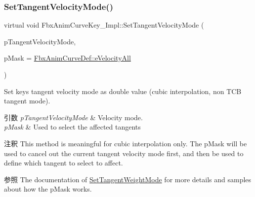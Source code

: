 \subsubsection{\texorpdfstring{Set\+Tangent\+Velocity\+Mode()}{SetTangentVelocityMode()}}
{\footnotesize\ttfamily virtual void Fbx\+Anim\+Curve\+Key\+\_\+\+Impl\+::\+Set\+Tangent\+Velocity\+Mode (\begin{DoxyParamCaption}\item[{\hyperlink{class_fbx_anim_curve_def_a747576beffa78ab236d2e140da395fff}{Fbx\+Anim\+Curve\+Def\+::\+E\+Velocity\+Mode}}]{p\+Tangent\+Velocity\+Mode,  }\item[{\hyperlink{class_fbx_anim_curve_def_a747576beffa78ab236d2e140da395fff}{Fbx\+Anim\+Curve\+Def\+::\+E\+Velocity\+Mode}}]{p\+Mask = {\ttfamily \hyperlink{class_fbx_anim_curve_def_a747576beffa78ab236d2e140da395fffab8603ba4ecc238f5dee7489b6a0123ee}{Fbx\+Anim\+Curve\+Def\+::e\+Velocity\+All}} }\end{DoxyParamCaption})\hspace{0.3cm}{\ttfamily [pure virtual]}}

Set key\textquotesingle{}s tangent velocity mode as double value (cubic interpolation, non T\+CB tangent mode). 
\begin{DoxyParams}{引数}
{\em p\+Tangent\+Velocity\+Mode} & Velocity mode. \\
\hline
{\em p\+Mask} & Used to select the affected tangents \\
\hline
\end{DoxyParams}
\begin{DoxyRemark}{注釈}
This method is meaningful for cubic interpolation only. The p\+Mask will be used to cancel out the current tangent velocity mode first, and then be used to define which tangent to select to affect.
\end{DoxyRemark}
\begin{DoxySeeAlso}{参照}
The documentation of \hyperlink{class_fbx_anim_curve_key___impl_a13388d0e2c45051c57a36aabddd311f9}{Set\+Tangent\+Weight\+Mode} for more details and samples about how the p\+Mask works. 
\end{DoxySeeAlso}
\mbox{\label{class_fbx_anim_curve_key___impl_a270f41a6f9808da3d6feb21bce1ca7d6}} 
